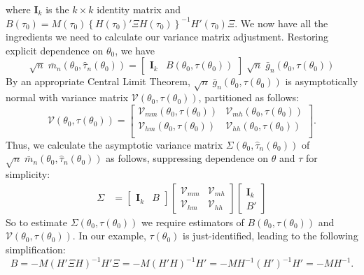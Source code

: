 \documentclass[12pt]{article}
\begin{document}
where $\mathbf{I}_k$ is the $k\times k$ identity matrix and $B(\tau_0) = M(\tau_0)\left\{ H(\tau_0)'\Xi H(\tau_0)\right\}^{-1} H'(\tau_0)\Xi$.
We now have all the ingredients we need to calculate our variance matrix adjustment.
Restoring explicit dependence on $\theta_0$, we have 
\[
  \sqrt{n}\; \bar{m}_n\left( \theta_0, \widehat{\tau}_n(\theta_0) \right) =  \left[
  \begin{array}{cc}
    \mathbf{I}_k & B\left( \theta_0, \tau(\theta_0) \right) 
\end{array}
\right] \; \sqrt{n}\; \bar{g}_n\left( \theta_0, \tau(\theta_0) \right)
\]
By an appropriate Central Limit Theorem, $\sqrt{n}\; \bar{g}_n\left( \theta_0, \tau(\theta_0) \right)$ is asymptotically normal with variance matrix $\mathcal{V}\left( \theta_0, \tau(\theta_0) \right)$, partitioned as follows:
\[
  \mathcal{V}\left( \theta_0, \tau(\theta_0) \right) = 
  \left[
  \begin{array}{cc}
    \mathcal{V}_{mm}\left( \theta_0, \tau(\theta_0) \right) & \mathcal{V}_{mh}\left( \theta_0, \tau(\theta_0) \right) \\
    \mathcal{V}_{hm}\left( \theta_0, \tau(\theta_0) \right) & \mathcal{V}_{hh}\left( \theta_0, \tau(\theta_0) \right) \\
  \end{array}
\right].
\]
Thus, we calculate the asymptotic variance matrix $\Sigma\left(\theta_0, \widehat{\tau}_n(\theta_0)\right)$ of $\sqrt{n}\; \bar{m}_n\left( \theta_0, \widehat{\tau}_n(\theta_0) \right)$ as follows, 
suppressing dependence on $\theta$ and $\tau$ for simplicity:
\begin{align*}
\Sigma &= 
\left[
\begin{array}{cc}
  \mathbf{I}_k & B
\end{array}
\right] 
\left[
\begin{array}{cc}
  \mathcal{V}_{mm} & \mathcal{V}_{mh}\\
  \mathcal{V}_{hm} & \mathcal{V}_{hh}
\end{array}
\right]
\left[
\begin{array}{c}
\mathbf{I}_k \\ B'
\end{array}
\right]
\end{align*}
So to estimate $\Sigma\left( \theta_0, \tau(\theta_0) \right)$ we require estimators of $B\left( \theta_0, \tau(\theta_0) \right)$ and $\mathcal{V}\left( \theta_0, \tau(\theta_0) \right)$.
In our example, $\tau(\theta_0)$ is just-identified, leading to the following simplification:
\[
  B = -M\left( H'\Xi H\right)^{-1} H'\Xi 
  = -M\left( H' H\right)^{-1} H' 
  = -M H^{-1} (H')^{-1} H' = -M H^{-1}.
\]
\end{document}
